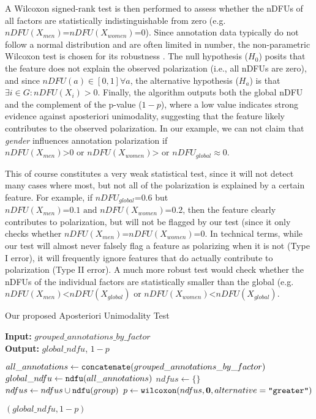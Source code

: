 A Wilcoxon signed-rank test is then performed to assess whether the \acp{nDFU} of all factors are statistically indistinguishable from zero (e.g. $nDFU(X_{men}) \text{=} nDFU(X_{women}) \text{=} 0$). Since annotation data typically do not follow a normal distribution and are often limited in number, the non-parametric Wilcoxon test is chosen for its robustness \cite{Rey2011}. The null hypothesis ($H_0$) posits that the feature does not explain the observed polarization (i.e., all \acp{nDFU} are zero), and since $nDFU(a) \in [0,1] \forall a$, the alternative hypothesis ($H_a$) is that $\exists i \in G: nDFU(X_i) > 0$. Finally, the algorithm outputs both the global \ac{nDFU} and the complement of the p-value ($1 - p$), where a low value indicates strong evidence against aposteriori unimodality, suggesting that the feature likely contributes to the observed polarization. In our example, we can not claim that \textit{gender} influences annotation polarization if $nDFU(X_{men}) \text{>} 0 \text{ or } nDFU(X_{women}) \text{>} \text{ or } nDFU_{global} \approx 0$.

This of course constitutes a very weak statistical test, since it will not detect many cases where most, but not all of the polarization is explained by a certain feature. For example, if $nDFU_{global} \text{=} 0.6$ but  $nDFU(X_{men}) \text{=} 0.1 \text{ and } nDFU(X_{women}) \text{=} 0.2$, then the feature clearly contributes to polarization, but will not be flagged by our test (since it only checks whether $nDFU(X_{men}) \text{=} nDFU(X_{women}) \text{=} 0$. In technical terms, while our test will almost never falsely flag a feature as polarizing when it is not (Type I error), it will frequently ignore features that do actually contribute to polarization (Type II error). A much more robust test would check whether the \acp{nDFU} of the individual factors are statistically smaller than the global (e.g. $nDFU(X_{men}) \text{<} nDFU(X_{global}) \text{ or } nDFU(X_{women}) \text{<} nDFU(X_{global})$.

\begin{algorithm}
	\caption{Our proposed Aposteriori Unimodality Test}
	\label{al:aposteriori_unimodality}
	\hspace*{\algorithmicindent} \textbf{Input:} $grouped\_annotations\_by\_factor$  \\
	\hspace*{\algorithmicindent} \textbf{Output:} $global\_ndfu$, $1 - p$ 
	\begin{algorithmic}[1]
		\State $all\_annotations \gets \texttt{concatenate}(grouped\_annotations\_by\_factor)$ 
		\State $global\_ndfu \gets \texttt{ndfu}(all\_annotations)$ 
		\State
		\State $ndfus \gets \{\}$
		\State $ndfus \gets  ndfus \cup \texttt{ndfu}(group)$ 
		\EndFor
		\State
		\State $p \gets \texttt{wilcoxon}(ndfus, \mathbf{0}, alternative=\texttt{"greater"})$
		
		\State \Return $(global\_ndfu, 1 - p)$
	\end{algorithmic}
\end{algorithm}

